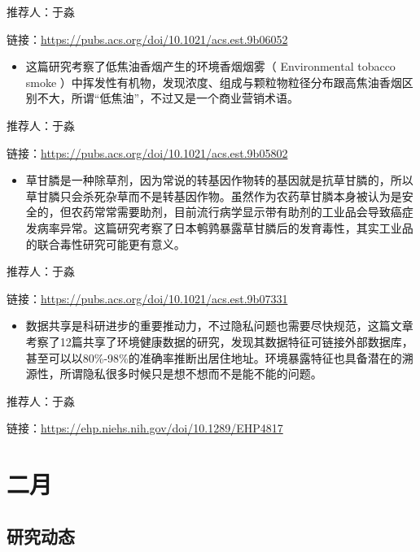\documentclass[]{book}
\providecommand{\tightlist}{%
  \setlength{\itemsep}{0pt}\setlength{\parskip}{0pt}}
\begin{document}
推荐人：于淼

链接：\url{https://pubs.acs.org/doi/10.1021/acs.est.9b06052}

\begin{itemize}
\tightlist
\item
  这篇研究考察了低焦油香烟产生的环境香烟烟雾（ Environmental tobacco smoke ）中挥发性有机物，发现浓度、组成与颗粒物粒径分布跟高焦油香烟区别不大，所谓``低焦油''，不过又是一个商业营销术语。
\end{itemize}

推荐人：于淼

链接：\url{https://pubs.acs.org/doi/10.1021/acs.est.9b05802}

\begin{itemize}
\tightlist
\item
  草甘膦是一种除草剂，因为常说的转基因作物转的基因就是抗草甘膦的，所以草甘膦只会杀死杂草而不是转基因作物。虽然作为农药草甘膦本身被认为是安全的，但农药常常需要助剂，目前流行病学显示带有助剂的工业品会导致癌症发病率异常。这篇研究考察了日本鹌鹑暴露草甘膦后的发育毒性，其实工业品的联合毒性研究可能更有意义。
\end{itemize}

推荐人：于淼

链接：\url{https://pubs.acs.org/doi/10.1021/acs.est.9b07331}

\begin{itemize}
\tightlist
\item
  数据共享是科研进步的重要推动力，不过隐私问题也需要尽快规范，这篇文章考察了12篇共享了环境健康数据的研究，发现其数据特征可链接外部数据库，甚至可以以80\%-98\%的准确率推断出居住地址。环境暴露特征也具备潜在的溯源性，所谓隐私很多时候只是想不想而不是能不能的问题。
\end{itemize}

推荐人：于淼

链接：\url{https://ehp.niehs.nih.gov/doi/10.1289/EHP4817}

\hypertarget{ux4e8cux6708-2}{%
\section*{二月}\label{ux4e8cux6708-2}}

\hypertarget{ux7814ux7a76ux52a8ux6001-27}{%
\subsection*{研究动态}\label{ux7814ux7a76ux52a8ux6001-27}}
\end{document}
